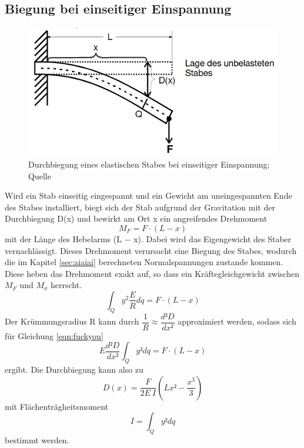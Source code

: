 \subsection{Biegung bei einseitiger Einspannung}
    \begin{figure}
        \centering
        \includegraphics[scale=0.5]{Lebertransuppe.png}
        \caption{Durchbiegung eines elastischen Stabes bei einseitiger Einspannung; Quelle \cite{sample}}
        \label{fig:lebertran}
    \end{figure}
    Wird ein Stab einseitig eingespannt und ein Gewicht am uneingespannten Ende des Stabes 
    installiert, biegt sich der Stab aufgrund der Gravitation mit der Durchbiegung D(x) 
    und bewirkt am Ort x ein angreifendes Drehmoment
    \begin{equation}
        M_F = F \cdot (L − x)
    \end{equation}
    mit der Länge des Hebelarms (L − x). Dabei wird das Eigengewicht des Staber vernachlässigt.
    Dieses Drehmoment verursacht eine Biegung des Stabes, wodurch die im Kapitel 
    \ref{sec:aiaiai} berechneten Normalspannungen zustande kommen. Diese heben das 
    Drehmoment exakt auf, so dass ein Kräftegleichgewicht zwischen $M_F$ und $M_{\sigma}$ herrscht.
    \begin{equation}
        \int_Q y^2 \dfrac{E}{R}dq  = F \cdot (L − x)
    \end{equation}
    Der Krümmungsradius R kann durch $\dfrac{1}{R} \approx 
    \dfrac{d²D}{dx²}$ approximiert werden, sodass sich für Gleichung \ref{eqn:fuckyou}
    \begin{equation}
        E \dfrac{d²D}{dx²} \int_Q y² dq=F\cdot(L-x)
    \end{equation}
    ergibt. Die Durchbiegung kann also zu
    \begin{equation}
        D(x)=\dfrac{F}{2 E \ I}(Lx²-\dfrac{x^3}{3})
    \end{equation}
    mit Flächenträgheitsmoment
    \begin{equation}
        I = \int_Q y² dq
    \end{equation}
    bestimmt werden.

